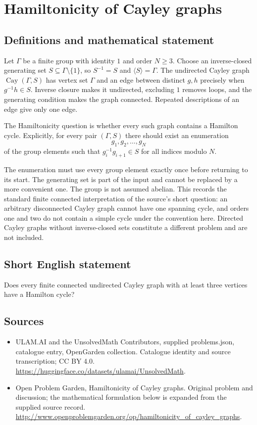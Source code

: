 \documentclass[11pt,a4paper]{article}
\begin{document}
\section*{Hamiltonicity of Cayley graphs}\label{statement}

\subsection{Definitions and mathematical statement}
Let $\Gamma$ be a finite group with identity $1$ and order
$N\geq3$. Choose an inverse-closed generating set
$S\subseteq\Gamma\setminus\{1\}$, so $S^{-1}=S$ and
$\langle S\rangle=\Gamma$. The undirected Cayley graph
$\operatorname{Cay}(\Gamma,S)$ has vertex set $\Gamma$ and
an edge between distinct $g,h$ precisely when
$g^{-1}h\in S$. Inverse closure makes it undirected,
excluding $1$ removes loops, and the generating condition
makes the graph connected. Repeated descriptions of an edge
give only one edge.

The Hamiltonicity question is whether every such graph
contains a Hamilton cycle. Explicitly, for every pair
$(\Gamma,S)$ there should exist an enumeration
\[
 g_1,g_2,\ldots,g_N
\]
of the group elements such that $g_i^{-1}g_{i+1}\in S$
for all indices modulo $N$.

The enumeration must use every group element exactly once
before returning to its start. The generating set is part
of the input and cannot be replaced by a more convenient
one. The group is not assumed abelian. This records the
standard finite connected interpretation of the source's
short question: an arbitrary disconnected Cayley graph
cannot have one spanning cycle, and orders one and two
do not contain a simple cycle under the convention here.
Directed Cayley graphs without inverse-closed sets constitute
a different problem and are not included.
\subsection{Short English statement}
Does every finite connected undirected Cayley graph with at least three vertices have a Hamilton cycle?
\subsection{Sources}
\begin{itemize}
\item[S1] ULAM.AI and the UnsolvedMath Contributors, supplied problems.json, catalogue entry, OpenGarden collection. Catalogue identity and source transcription; CC BY 4.0.
\url{https://huggingface.co/datasets/ulamai/UnsolvedMath}.
\item[S2] Open Problem Garden, Hamiltonicity of Cayley graphs. Original problem and discussion; the mathematical formulation below is expanded from the supplied source record.
\url{http://www.openproblemgarden.org/op/hamiltonicity_of_cayley_graphs}.
\end{itemize}
\end{document}
